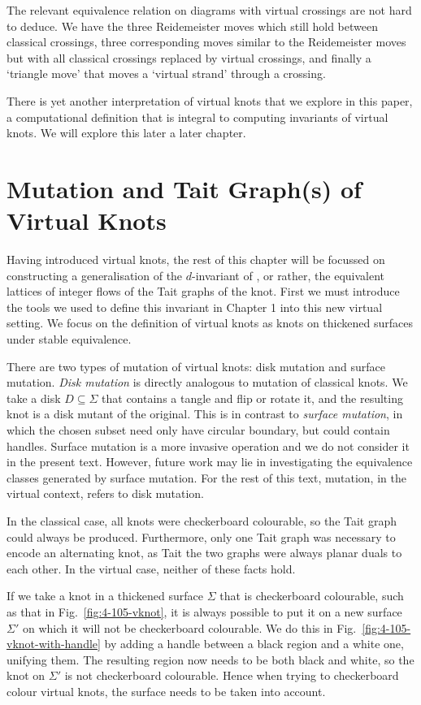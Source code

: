 \documentclass[12pt]{report}
\begin{document}
The relevant equivalence relation on diagrams with virtual crossings are not hard to deduce. We have the three Reidemeister moves which still hold between classical crossings, three corresponding moves similar to the Reidemeister moves but with all classical crossings replaced by virtual crossings, and finally a `triangle move' that moves a `virtual strand' through a crossing.

There is yet another interpretation of virtual knots that we explore in this paper, a computational definition that is integral to computing invariants of virtual knots. We will explore this later a later chapter.

\section{Mutation and Tait Graph(s) of Virtual Knots}
Having introduced virtual knots, the rest of this chapter will be focussed on constructing a generalisation of the $d$-invariant of \cite{lattices-graphs-mutation}, or rather, the equivalent lattices of integer flows of the Tait graphs of the knot. First we must introduce the tools we used to define this invariant in Chapter 1 into this new virtual setting. We focus on the definition of virtual knots as knots on thickened surfaces under stable equivalence.

There are two types of mutation of virtual knots: disk mutation and surface mutation. \textit{Disk mutation} is directly analogous to mutation of classical knots. We take a disk $D \subseteq \Sigma$ that contains a tangle and flip or rotate it, and the resulting knot is a disk mutant of the original. This is in contrast to \textit{surface mutation}, in which the chosen subset need only have circular boundary, but could contain handles. Surface mutation is a more invasive operation and we do not consider it in the present text. However, future work may lie in investigating the equivalence classes generated by surface mutation. For the rest of this text, mutation, in the virtual context, refers to disk mutation.

In the classical case, all knots were checkerboard colourable, so the Tait graph could always be produced. Furthermore, only one Tait graph was necessary to encode an alternating knot, as Tait the two graphs were always planar duals to each other. In the virtual case, neither of these facts hold.

If we take a knot in a thickened surface $\Sigma$ that is checkerboard colourable, such as that in Fig.~\ref{fig:4-105-vknot}, it is always possible to put it on a new surface $\Sigma'$ on which it will not be checkerboard colourable. We do this in Fig.~\ref{fig:4-105-vknot-with-handle} by adding a handle between a black region and a white one, unifying them. The resulting region now needs to be both black and white, so the knot on $\Sigma'$ is not checkerboard colourable. Hence when trying to checkerboard colour virtual knots, the surface needs to be taken into account.
\end{document}
